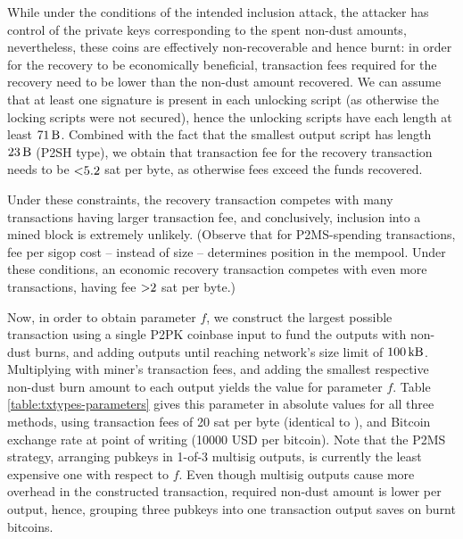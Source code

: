 \documentclass[a4paper,11pt,titlepage]{scrbook}
\begin{document}
While under the conditions of the intended inclusion attack, the attacker has control of the private keys corresponding to the spent non-dust amounts, nevertheless, these coins are effectively non-recoverable and hence burnt: in order for the recovery to be economically beneficial, transaction fees required for the recovery need to be lower than the non-dust amount recovered.
We can assume that at least one signature is present in each unlocking script (as otherwise the locking scripts were not secured), hence the unlocking scripts have each length at least $\SI{71}{\byte}$. Combined with the fact that the smallest output script has length $\SI{23}{\byte}$ (P2SH type), we obtain that transaction fee for the recovery transaction needs to be $\num{<5.2}$ sat per byte, as otherwise fees exceed the funds recovered.

Under these constraints, the recovery transaction competes with many transactions having larger transaction fee, and conclusively, inclusion into a mined block is extremely unlikely.
(Observe that for P2MS-spending transactions, fee per sigop cost – instead of size – determines position in the mempool. Under these conditions, an economic recovery transaction competes with even more transactions, having fee $\num{>2}$ sat per byte.)


Now, in order to obtain parameter $f$, we construct the largest possible transaction  using a single P2PK coinbase input to fund the outputs with non-dust burns, and adding outputs until reaching network's size limit of $\SI{100}{\kilo\byte}$.
Multiplying with miner's transaction fees, and adding the smallest respective non-dust burn amount to each output yields the value for parameter $f$.
Table \ref{table:txtypes-parameters} gives this parameter in absolute values for all three methods, using transaction fees of 20 sat per byte (identical to \cite{sward_data_2018}), and Bitcoin exchange rate at point of writing (\num{10000} USD per bitcoin).
Note that the P2MS strategy, arranging pubkeys in 1-of-3 multisig outputs, is currently the least expensive one with respect to $f$.
Even though multisig outputs cause more overhead in the constructed transaction, required non-dust amount is lower per output, hence, grouping three pubkeys into one transaction output saves on burnt bitcoins.
\end{document}
